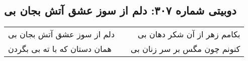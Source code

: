 \begin{center}
\section*{دوبیتی شماره ۳۰۷: دلم از سوز عشق آتش بجان بی}
\label{sec:307}
\begin{longtable}{l p{0.5cm} r}
دلم از سوز عشق آتش بجان بی
&&
بکامم زهر از آن شکر دهان بی
\\
همان دستان که با ته بی بگردن
&&
کنونم چون مگس بر سر زنان بی
\\
\end{longtable}
\end{center}

